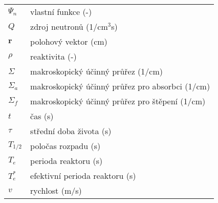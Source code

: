 \begin{table}[H]
\begin{tabular}{p{1cm}l}
  $\Psi_n$        & vlastní funkce (-) \\
  $Q$             & zdroj neutronů (1/cm$^3$s) \\
  $\textbf{r}$    & polohový vektor (cm) \\
  $\rho$          & reaktivita (-) \\
  $\Sigma$        & makroskopický účinný průřez (1/cm) \\
  $\Sigma_a$      & makroskopický účinný průřez pro absorbci (1/cm) \\
  $\Sigma_f$      & makroskopický účinný průřez pro štěpení (1/cm) \\
  $t$             & čas (s) \\
  $\tau$          & střední doba života (s) \\
  $T_{1/2}$       & poločas rozpadu (s) \\
  $T_e$           & perioda reaktoru (s) \\
  $T_e^*$         & efektivní perioda reaktoru (s) \\
  $v$             & rychlost (m/s) \\

\end{tabular}
\end{table}
\renewcommand{\arraystretch}{1}
